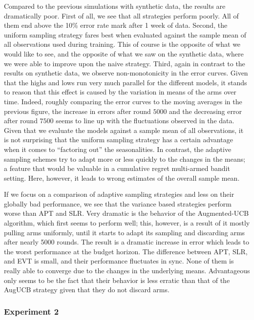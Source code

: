 \documentclass[11pt,]{article}
\begin{document}
Compared to the previous simulations with synthetic data, the results
are dramatically poor. First of all, we see that all strategies perform
poorly. All of them end above the 10\% error rate mark after 1 week of
data. Second, the uniform sampling strategy fares best when evaluated
against the sample mean of all observations used during training. This
of course is the opposite of what we would like to see, and the opposite
of what we saw on the synthetic data, where we were able to improve upon
the naive strategy. Third, again in contrast to the results on synthetic
data, we observe non-monotonicity in the error curves. Given that the
highs and lows run very much parallel for the different models, it
stands to reason that this effect is caused by the variation in means of
the arms over time. Indeed, roughly comparing the error curves to the
moving averages in the previous figure, the increase in errors after
round \(5000\) and the decreasing error after round \(7500\) seems to
line up with the fluctuations observed in the data. Given that we
evaluate the models against a sample mean of all observations, it is not
surprising that the uniform sampling strategy has a certain advantage
when it comes to ``factoring out'' the seasonalities. In contrast, the
adaptive sampling schemes try to adapt more or less quickly to the
changes in the means; a feature that would be valuable in a cumulative
regret multi-armed bandit setting. Here, however, it leads to wrong
estimates of the overall sample mean.

If we focus on a comparison of adaptive sampling strategies and less on
their globally bad performance, we see that the variance based
strategies perform worse than APT and SLR. Very dramatic is the behavior
of the Augmented-UCB algorithm, which first seems to perform well; this,
however, is a result of it mostly pulling arms uniformly, until it
starts to adapt its sampling and discarding arms after nearly 5000
rounds. The result is a dramatic increase in error which leads to the
worst performance at the budget horizon. The difference between APT,
SLR, and EVT is small, and their performance fluctuates in sync. None of
them is really able to converge due to the changes in the underlying
means. Advantageous only seems to be the fact that their behavior is
less erratic than that of the AugUCB strategy given that they do not
discard arms.

\subsubsection{Experiment 2}\label{experiment-2}
\end{document}
